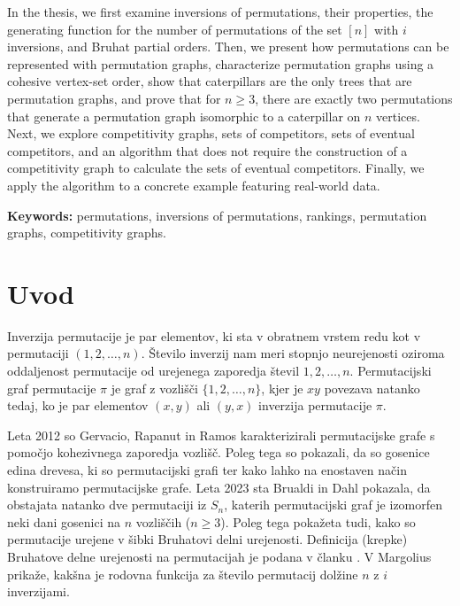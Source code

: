 \documentclass[a4paper, 12pt]{book}
\newcommand{\tkeywordsEn}{permutations, inversions of permutations, rankings, permutation graphs, competitivity graphs}
\newcommand{\clearemptydoublepage}{\newpage{\pagestyle{empty}\cleardoublepage}}
\begin{document}
\noindent 
In the thesis, we first examine inversions of permutations, their properties, the generating function for the number of permutations of the set $[n]$ with $i$ inversions, and Bruhat partial orders. Then, we present how permutations can be represented with permutation graphs, characterize permutation graphs using a cohesive vertex-set order, show that caterpillars are the only trees that are permutation graphs, and prove that for $n \geq 3$, there are exactly two permutations that generate a permutation graph isomorphic to a caterpillar on $n$ vertices. Next, we explore competitivity graphs, sets of competitors, sets of eventual competitors, and an algorithm that does not require the construction of a competitivity graph to calculate the sets of eventual competitors. Finally, we apply the algorithm to a concrete example featuring real-world data.
\bigskip

\noindent\textbf{Keywords:} \tkeywordsEn.
\clearemptydoublepage

\mainmatter
\setcounter{page}{1}
\pagestyle{fancy}

\chapter {Uvod}

Inverzija permutacije je par elementov, ki sta v obratnem vrstem redu kot v permutaciji $(1, 2,\dots, n)$. Število inverzij nam meri stopnjo neurejenosti oziroma oddaljenost permutacije od urejenega zaporedja števil $1, 2, \dots, n$. Permutacijski graf permutacije $\pi$ je graf z vozlišči $\{ 1, 2, \dots, n \}$, kjer je $xy$ povezava natanko tedaj, ko je par elementov $(x, y)$ ali $(y, x)$ inverzija permutacije $\pi$. 

Leta 2012 so Gervacio, Rapanut in Ramos \cite{charectarizationPermutationGraphs} karakterizirali permutacijske grafe s pomočjo kohezivnega zaporedja vozlišč. Poleg tega so pokazali, da so gosenice edina drevesa, ki so permutacijski grafi ter kako lahko na enostaven način konstruiramo permutacijske grafe. Leta 2023 sta Brualdi in Dahl \cite{weakBruhatOrder} pokazala, da obstajata natanko dve permutaciji iz $S_n$, katerih permutacijski graf je izomorfen neki dani gosenici na $n$ vozliščih ($n \geq 3$). Poleg tega pokažeta tudi, kako so permutacije urejene v šibki Bruhatovi delni urejenosti. Definicija (krepke) Bruhatove delne urejenosti na permutacijah je podana v članku \cite{bruhatOrder}. V \cite{generatingFunction} Margolius prikaže, kakšna je rodovna funkcija za število permutacij dolžine $n$ z $i$ inverzijami.
\end{document}
